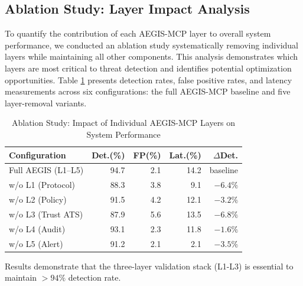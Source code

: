 \documentclass[12pt,twocolumn,journal]{IEEEtran}
\begin{document}
\subsection{Ablation Study: Layer Impact Analysis}

To quantify the contribution of each AEGIS-MCP layer to overall system performance, we conducted an ablation study systematically removing individual layers while maintaining all other components. This analysis demonstrates which layers are most critical to threat detection and identifies potential optimization opportunities. Table \ref{tab:ablation_study} presents detection rates, false positive rates, and latency measurements across six configurations: the full AEGIS-MCP baseline and five layer-removal variants.

\begin{table}[!h]
\centering
\caption{Ablation Study: Impact of Individual AEGIS-MCP Layers on System Performance}
\label{tab:ablation_study}
\small
\begin{tabularx}{\columnwidth}{X|r|r|r|r}
\toprule
\textbf{Configuration} & \textbf{Det.(\%)} & \textbf{FP(\%)} & \textbf{Lat.(\%)} & \textbf{$\Delta$Det.} \\
\midrule
Full AEGIS (L1--L5) & 94.7 & 2.1 & 14.2 & baseline \\
w/o L1 (Protocol)   & 88.3 & 3.8 &  9.1 & $-6.4\%$ \\
w/o L2 (Policy)     & 91.5 & 4.2 & 12.1 & $-3.2\%$ \\
w/o L3 (Trust ATS)  & 87.9 & 5.6 & 13.5 & $-6.8\%$ \\
w/o L4 (Audit)      & 93.1 & 2.3 & 11.8 & $-1.6\%$ \\
w/o L5 (Alert)      & 91.2 & 2.1 &  2.1 & $-3.5\%$ \\
\bottomrule
\end{tabularx}
\end{table}

Results demonstrate that the three-layer validation stack (L1-L3) is essential to maintain $> 94\%$ detection rate.
\end{document}
